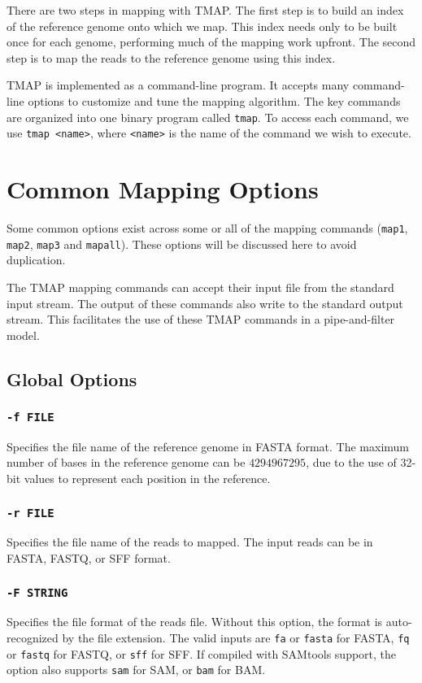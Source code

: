 \documentclass[a4paper,12pt]{book}
\newcommand{\TT}[1]{{\tt #1}} %
\begin{document}
There are two steps in mapping with TMAP.
The first step is to build an index of the reference genome onto which we map.
This index needs only to be built once for each genome, performing much of the mapping work upfront.
The second step is to map the reads to the reference genome using this index.

TMAP is implemented as a command-line program.
It accepts many command-line options to customize and tune the mapping algorithm.
The key commands are organized into one binary program called \TT{tmap}.
To access each command, we use \TT{tmap <name>}, where \TT{<name>} is the name of the command we wish to execute.

\section{Common Mapping Options}
\label{sec:commonoptions}
Some common options exist across some or all of the mapping commands (\TT{map1}, \TT{map2}, \TT{map3} and \TT{mapall}). 
These options will be discussed here to avoid duplication.

The TMAP mapping commands can accept their input file from the standard input stream.
The output of these commands also write to the standard output stream.
This facilitates the use of these TMAP commands in a pipe-and-filter model.

\subsection{Global Options}
\subsubsection{\TT{-f FILE}}
Specifies the file name of the reference genome in FASTA format.
The maximum number of bases in the reference genome can be $4294967295$, due to the use of 32-bit values to represent each position in the reference.

\subsubsection{\TT{-r FILE}}
Specifies the file name of the reads to mapped.
The input reads can be in FASTA, FASTQ, or SFF format.

\subsubsection{\TT{-F STRING}}
Specifies the file format of the reads file.
Without this option, the format is auto-recognized by the file extension.
The valid inputs are \TT{fa} or \TT{fasta} for FASTA, \TT {fq} or \TT{fastq} for FASTQ, or \TT{sff} for SFF.
If compiled with SAMtools support, the option also supports \TT{sam} for SAM, or \TT{bam} for BAM.
\end{document}
